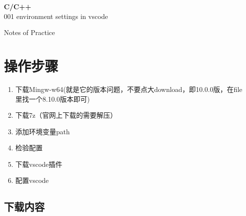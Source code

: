 \documentclass{book}
\begin{document}
 \begin{titlepage}
 \color{darkgray} 
 \begingroup
 \thispagestyle{empty}
 \centering
 \vspace*{5cm}
 \par\normalfont\fontsize{35}{35}\sffamily\selectfont
 \textbf{C/C++}\\ 
 {\LARGE 001 environment settings in vscode}\par %
 \vspace*{1cm}
 {\Huge Notes of Practice}\par %
 \endgroup
 \end{titlepage}



 \section{操作步骤}


\par \begin{enumerate}
 \item 下载Mingw-w64(就是它的版本问题，不要点大download，即10.0.0版，在file里找一个8.10.0版本即可)
 \item 下载7z（官网上下载的需要解压）
 \item 添加环境变量path
 \item 检验配置
 \item 下载vscode插件
 \item 配置vscode
\end{enumerate}

\color{darkgray}
 \begin{shaded}
 {\subsection[short]{下载内容}}
\end{shaded}
\color{black}
\end{document}
